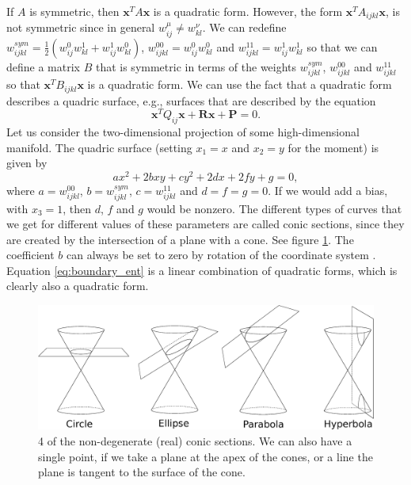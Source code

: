If $A$ is symmetric, then $\mathbf{x}^TA\mathbf{x}$ is a quadratic form. However, the form $ \mathbf{x}^TA_{ijkl}\mathbf{x}$, is not symmetric since in general ${w}_{ij}^\mu \neq {w}_{kl}^\nu$. We can redefine ${w}^{sym}_{ijkl} = \frac{1}{2}({w}^{0}_{ij}{w}^{1}_{kl} + {w}^{1}_{ij}{w}^{0}_{kl})$, ${w}^{00}_{ijkl} = {w}_{ij}^0 {w}_{kl}^0$ and ${w}^{11}_{ijkl} = {w}_{ij}^1 {w}_{kl}^1$ so that we can define a matrix $B$ that is symmetric in terms of the weights $ {w}^{sym}_{ijkl}$, ${w}^{00}_{ijkl}$ and $ {w}^{11}_{ijkl}$ so that $ \mathbf{x}^TB_{ijkl}\mathbf{x}$ is a quadratic form. We can use the fact that a quadratic form describes a quadric surface, e.g., surfaces that are described by the equation
\begin{equation}
    \mathbf{x}^T Q_{ij} \mathbf{x} + \mathbf{R} \mathbf{x} + \mathbf{P} = 0.
    \label{eq:quadric_equation}
\end{equation}
Let us consider the two-dimensional projection of some high-dimensional manifold. The quadric surface (setting $x_1=x$ and $x_2=y$ for the moment) is given by
\begin{equation}
    a x^2 + 2bxy + cy^2+ 2dx +2fy +g = 0,
    \label{eq:quadric_params}
\end{equation}
where $a=w^{00}_{ijkl}$, $b ={w}^{sym}_{ijkl}$, $c=w^{11}_{ijkl}$ and $d=f=g=0$. If we would add a bias, with $x_3=1$, then $d$, $f$ and $g$ would be nonzero. The different types of curves that we get for different values of these parameters are called conic sections, since they are created by the intersection of a plane with a cone. See figure \ref{fig:conic_sections}. The coefficient $b$ can always be set to zero by rotation of the coordinate system \cite{Weisstein}. Equation \ref{eq:boundary_ent} is a linear combination of quadratic forms, which is clearly also a quadratic form.
\begin{figure}
    \centering
    \includegraphics[width=\textwidth]{figures/chapter3/conic_sections.eps}
    \caption{4 of the non-degenerate (real) conic sections. We can also have a single point, if we take a plane at the apex of the cones, or a line the plane is tangent to the surface of the cone.}
    \label{fig:conic_sections}
\end{figure}

